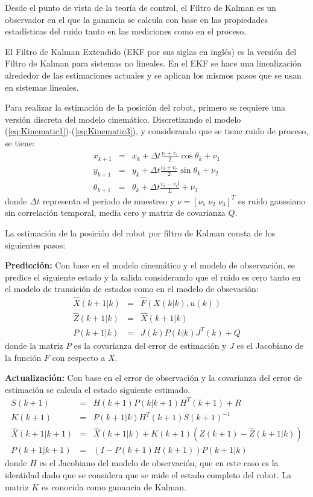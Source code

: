 \documentclass[a4paper]{article}
\begin{document}
Desde el punto de vista de la teoría de control, el Filtro de Kalman es un observador en el que la ganancia se calcula con base en las propiedades estadísticas del ruido tanto en las mediciones como en el proceso. 

El Filtro de Kalman Extendido (EKF por sus siglas en inglés) es la versión del Filtro de Kalman para sistemas no lineales. En el EKF se hace una linealización alrededor de las estimaciones actuales y se aplican los mismos pasos que se usan en sistemas lineales. 

Para realizar la estimación de la posición del robot, primero se requiere una versión discreta del modelo cinemático. Discretizando el modelo (\ref{eq:Kinematic1})-(\ref{eq:Kinematic3}), y considerando que se tiene ruido de proceso, se tiene:
\begin{eqnarray}
x_{k+1} &=& x_k + \Delta t \frac{v_l + v_r}{2}\cos\theta_k + \nu_1\label{eq:Discrete1}\\
y_{k+1} &=& y_k + \Delta t \frac{v_l + v_r}{2}\sin\theta_k + \nu_2\\
\theta_{k+1} &=& \theta_k + \Delta t \frac{v_r - v_il}{L} + \nu_3\label{eq:Discrete3}
\end{eqnarray}
donde $\Delta t$ representa el periodo de muestreo y $\nu = \left[\nu_1\;\nu_2\;\nu_3\right]^T$ es ruido gaussiano sin correlación temporal, media cero y matriz de covarianza $Q$. 

La estimación de la posición del robot por filtro de Kalman consta de los siguientes pasos:

\textbf{Predicción:} Con base en el modelo cinemático y el modelo de observación, se predice el siguiente estado y la salida considerando que el ruido es cero tanto en el modelo de transición de estados como en el modelo de obsevación:
\begin{eqnarray*}
\hat{X}(k+1|k) &=& \hat{F}(X(k|k), u(k))\\
\hat{Z}(k+1|k) &=& \hat{X}(k+1|k)\\
P(k+1|k) &=& J(k)P(k|k)J^T(k) + Q
\end{eqnarray*}
donde la matriz $P$ es la covarianza del error de estimación y $J$ es el Jacobiano de la función $F$ con respecto a $X$.

\textbf{Actualización:} Con base en el error de observación y la covarianza del error de estimación se calcula el estado siguiente estimado.
\begin{eqnarray*}
S(k+1) &=& H(k+1)P(k|k+1)H^T(k+1) + R\\
K(k+1) &=& P(k+1|k)H^T(k+1)S(k+1)^{-1}\\
\hat{X}(k+1|k+1) &=& \hat{X}(k+1|k) + K(k+1)(Z(k+1) - \hat{Z}(k+1|k))\\
P(k+1|k+1) &=& (I-P(k+1)H(k+1))P(k+1|k)
\end{eqnarray*}
donde $H$ es el Jacobiano del modelo de observación, que en este caso es la identidad dado que se considera que se mide el estado completo del robot. La matriz $K$ es conocida como ganancia de Kalman.
\end{document}
